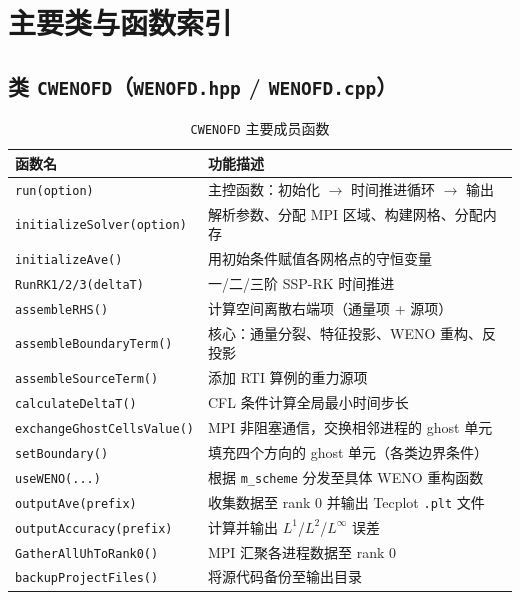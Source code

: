 \documentclass{article}
\numberwithin{equation}{section}
\begin{document}
\section{主要类与函数索引}

\subsection{类 \texttt{CWENOFD}（\texttt{WENOFD.hpp} / \texttt{WENOFD.cpp}）}

\begin{table}[H]
\centering
\caption{\texttt{CWENOFD} 主要成员函数}
\begin{tabularx}{\textwidth}{lX}
\toprule
函数名 & 功能描述 \\
\midrule
\texttt{run(option)} & 主控函数：初始化 $\to$ 时间推进循环 $\to$ 输出 \\
\texttt{initializeSolver(option)} & 解析参数、分配 MPI 区域、构建网格、分配内存 \\
\texttt{initializeAve()} & 用初始条件赋值各网格点的守恒变量 \\
\texttt{RunRK1/2/3(deltaT)} & 一/二/三阶 SSP-RK 时间推进 \\
\texttt{assembleRHS()} & 计算空间离散右端项（通量项 + 源项）\\
\texttt{assembleBoundaryTerm()} & 核心：通量分裂、特征投影、WENO 重构、反投影 \\
\texttt{assembleSourceTerm()} & 添加 RTI 算例的重力源项 \\
\texttt{calculateDeltaT()} & CFL 条件计算全局最小时间步长 \\
\texttt{exchangeGhostCellsValue()} & MPI 非阻塞通信，交换相邻进程的 ghost 单元 \\
\texttt{setBoundary()} & 填充四个方向的 ghost 单元（各类边界条件）\\
\texttt{useWENO(...)} & 根据 \texttt{m\_scheme} 分发至具体 WENO 重构函数 \\
\texttt{outputAve(prefix)} & 收集数据至 rank 0 并输出 Tecplot \texttt{.plt} 文件 \\
\texttt{outputAccuracy(prefix)} & 计算并输出 $L^1$/$L^2$/$L^\infty$ 误差 \\
\texttt{GatherAllUhToRank0()} & MPI 汇聚各进程数据至 rank 0 \\
\texttt{backupProjectFiles()} & 将源代码备份至输出目录 \\
\bottomrule
\end{tabularx}
\end{table}
\end{document}
